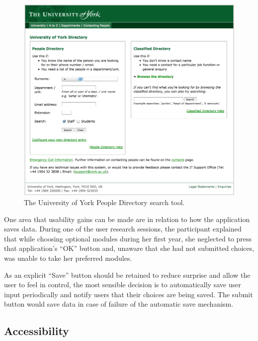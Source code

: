\documentclass[]{scrartcl}
\begin{document}
\begin{figure}
  \begin{center}
    \includegraphics[width=160mm]{images/2011_11_06_yorkacuk_directory.png}
  \end{center}
  \caption{The University of York People Directory search tool.}
  \label{yorkacuk_directory_search}
\end{figure}


One area that usability gains can be made are in relation to how the
application saves data. During one of the user research sessions, the
participant explained that while choosing optional modules during her first
year, she neglected to press that application's ``OK'' button and, unaware
that she had not submitted choices, was unable to take her preferred modules.

As an explicit ``Save'' button should be retained to reduce surprise and allow
the user to feel in control, the most sensible decision is to automatically
save user input periodically and notify users that their choices are being
saved. The submit button would save data in case of failure of the automatic
save mechanism.

\subsection{Accessibility}
\end{document}
